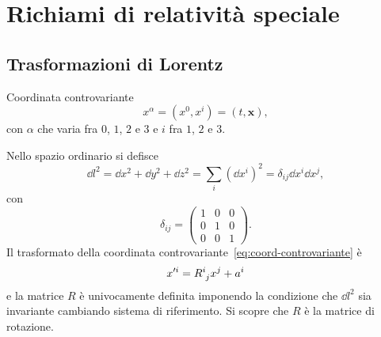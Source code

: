 \chapter{Richiami di relatività speciale}
\label{cha:relativita-speciale}

\section{Trasformazioni di Lorentz}
\label{sec:trasformazioni-lorentz}

Coordinata controvariante
\begin{equation}
  \label{eq:coord-controvariante}
  x^{\alpha} = (x^{0},x^{i}) = (t, \bm{x}),
\end{equation}
con $\alpha$ che varia fra $0$, $1$, $2$ e $3$ e $i$ fra $1$, $2$ e $3$.

Nello spazio ordinario si defisce
\begin{equation}
  \dd l^{2}   = \dd x^{2} + \dd y^{2} + \dd z^{2} = \sum_{i} (\dd x^{i})^{2} =
  \delta_{ij}\dd x^{i} \dd x^{j},
\end{equation}
con
\begin{equation}
  \delta_{ij} =
  \begin{pmatrix}
    1 & 0 & 0 \\
    0 & 1 & 0 \\
    0 & 0 & 1
  \end{pmatrix}.
\end{equation}
Il trasformato della coordinata controvariante~\eqref{eq:coord-controvariante} è
\begin{equation}
  x'^{i} = \tensor{R}{^{i}_{j}}x^{j} + a^{i}
\end{equation}
e la matrice $R$ è univocamente definita imponendo la condizione che $\dd l^{2}$
sia invariante cambiando sistema di riferimento.  Si scopre che $R$ è la matrice
di rotazione.

